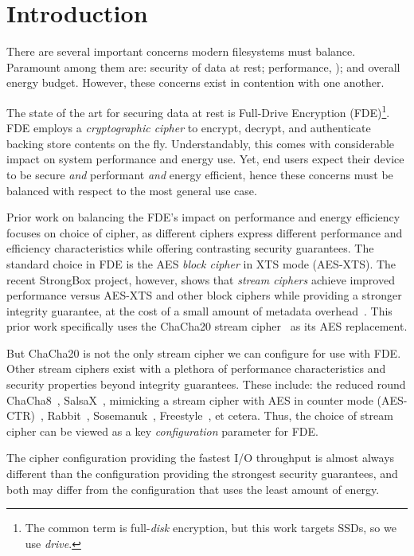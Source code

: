 \section{Introduction}\label{sec:introduction}

There are several important concerns modern filesystems must balance. Paramount
among them are: security of data at rest; performance, ); and overall energy budget. However, these concerns exist in
contention with one another.

The state of the art for securing data at rest is Full-Drive Encryption
(FDE)\footnote{The common term is full-\emph{disk} encryption, but this work
targets SSDs, so we use \emph{drive}.}. FDE employs a \emph{cryptographic
cipher} to encrypt, decrypt, and authenticate backing store contents on the fly.
Understandably, this comes with considerable impact on system performance and
energy use.  Yet, end users expect their device to be secure
\emph{and} performant \emph{and} energy efficient, hence these concerns must be
balanced with respect to the most general use case.

Prior work on balancing the FDE's impact on performance and energy efficiency
focuses on choice of cipher, as different ciphers express different performance
and efficiency characteristics while offering contrasting security guarantees.
The standard choice in FDE is the AES \emph{block cipher} in XTS mode (AES-XTS).
The recent StrongBox project, however, shows that \emph{stream ciphers} achieve
improved performance versus AES-XTS and other block ciphers while providing a
stronger integrity guarantee, at the cost of a small amount of metadata
overhead~\cite{StrongBox}. This prior work specifically uses the ChaCha20 stream
cipher~\cite{ChaCha20} as its AES replacement.

But ChaCha20 is not the only stream cipher we can configure for use with FDE.
Other stream ciphers exist with a plethora of performance characteristics and
security properties beyond integrity guarantees. These include: the reduced
round ChaCha8~\cite{ChaCha8}, SalsaX~\cite{SalsaX}, mimicking a stream cipher
with AES in counter mode (AES-CTR)~\cite{AES-CTR}, Rabbit~\cite{Rabbit},
Sosemanuk~\cite{Sosemanuk}, Freestyle~\cite{Freestyle}, et cetera. Thus, the
choice of stream cipher can be viewed as a key \emph{configuration} parameter
for FDE.

The cipher configuration providing the fastest I/O throughput is almost always
different than the configuration providing the strongest security guarantees,
and both may differ from the configuration that uses the least amount of energy.

